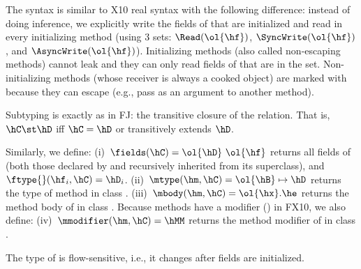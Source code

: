 \documentclass[a4paper]{article}
\begin{document}
The syntax is similar to X10 real syntax with the following difference:
    instead of doing inference, we explicitly write the fields of \this that are initialized and read in
    every initializing method
    (using 3 sets: $\Read(\ol{\hf})$, $\SyncWrite(\ol{\hf})$, and $\AsyncWrite(\ol{\hf})$).
Initializing methods (also called non-escaping methods) cannot leak \this and they can only read fields of \this that are in the \Read set.
Non-initializing methods (whose receiver is always a cooked object) are marked with \hescaping
    because they can escape \this (e.g., pass \this as an argument to another method).



{Subtyping} is exactly as in FJ:
    the transitive closure of the \hextends relation.
That is, $\hC \st \hD$ iff $\hC=\hD$ or \hC transitively extends $\hD$.

Similarly, we define:
(i)~$\fields(\hC)=\ol{\hD}~\ol{\hf}$ returns all fields of \hC (both those declared by \hC and recursively inherited from its superclass),
    and~$\ftype{}(\hf_i,\hC) =\hD_i$.
(ii)~$\mtype(\hm,\hC) = \ol{\hB}\mapsto\hD$ returns the type of method \hm in class \hC.
(iii)~$\mbody(\hm,\hC) = \ol{\hx}.\he$ returns the method body of \hm in class \hC.
Because methods have a modifier (\hMM) in FX10, we also define:
(iv)~$\mmodifier(\hm,\hC) = \hMM$ returns the method modifier of \hm in class \hC.

The type of \this is flow-sensitive, i.e., it changes after fields are initialized.
\end{document}
